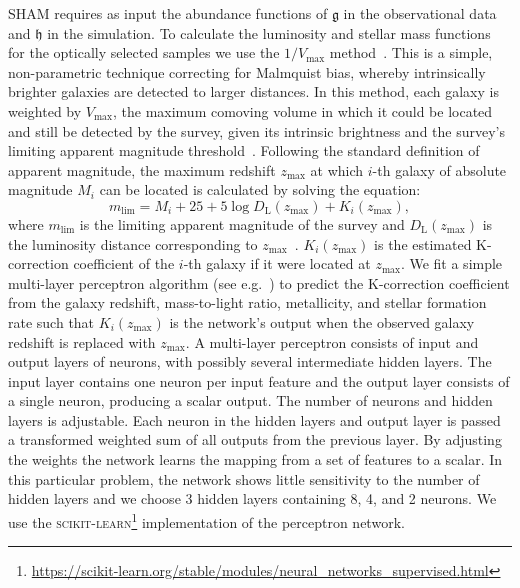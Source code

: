 \documentclass[usenatbib,useAMS]{mnras}
\begin{document}
\Acl{SHAM} requires as input the abundance functions of $\mathfrak{g}$ in the observational data and $\mathfrak{h}$ in the simulation. To calculate the luminosity and stellar mass functions for the optically selected samples we use the $1 / V_{\max}$ method~\citep{Schidt:1968}. This is a simple, non-parametric technique correcting for Malmquist bias, whereby intrinsically brighter galaxies are detected to larger distances. In this method, each galaxy is weighted by $V_{\max}$, the maximum comoving volume in which it could be located and still be detected by the survey, given its intrinsic brightness and the survey's limiting apparent magnitude threshold~\citep{Malmquist1920, Malmquist1922}. Following the standard definition of apparent magnitude, the maximum redshift $z_{\max}$ at which $i$-th galaxy of absolute magnitude $M_i$ can be located is calculated by solving the equation:
%
\begin{equation}\label{eq:apparent_magnitude_zmax}
    m_{\mathrm{lim}}
    =
    M_i + 25 + 5\log D_{\mathrm{L}}(z_{\max}) + K_i(z_{\max}),
\end{equation}
%
where $m_{\mathrm{lim}}$ is the limiting apparent magnitude of the survey and $D_{\mathrm{L}}(z_{\max})$ is the luminosity distance corresponding to $z_{\max}$~\citep{Hogg1999}. $K_i (z_{\max})$ is the estimated K-correction coefficient of the $i$-th galaxy if it were located at $z_{\max}$. We fit a simple multi-layer perceptron algorithm (see e.g.~\citet{10.5555/525960}) to predict the K-correction coefficient from the galaxy redshift, mass-to-light ratio, metallicity, and stellar formation rate such that $K_i (z_{\max})$ is the network's output when the observed galaxy redshift is replaced with $z_{\max}$. A multi-layer perceptron consists of input and output layers of neurons, with possibly several intermediate hidden layers. The input layer contains one neuron per input feature and the output layer consists of a single neuron, producing a scalar output. The number of neurons and hidden layers is adjustable. Each neuron in the hidden layers and output layer is passed a transformed weighted sum of all outputs from the previous layer. By adjusting the weights the network learns the mapping from a set of features to a scalar. In this particular problem, the network shows little sensitivity to the number of hidden layers and we choose 3 hidden layers containing 8, 4, and 2 neurons. We use the \textsc{scikit-learn}\footnote{\url{https://scikit-learn.org/stable/modules/neural_networks_supervised.html}} implementation of the perceptron network.
\end{document}
